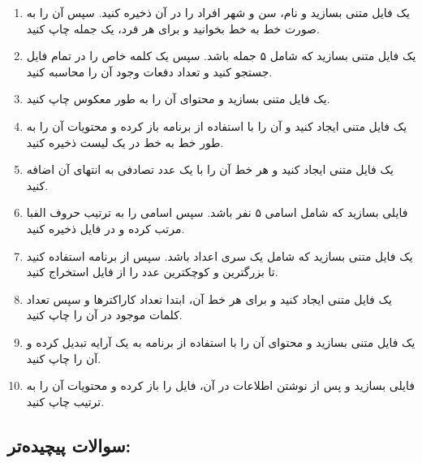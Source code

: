 \documentclass[a4paper,12pt]{article}
\begin{document}
	\begin{enumerate}
		\item یک فایل متنی بسازید و نام، سن و شهر افراد را در آن ذخیره کنید. سپس آن را به صورت خط به خط بخوانید و برای هر فرد، یک جمله چاپ کنید.
		\item یک فایل متنی بسازید که شامل ۵ جمله باشد. سپس یک کلمه خاص را در تمام فایل جستجو کنید و تعداد دفعات وجود آن را محاسبه کنید.
		\item یک فایل متنی بسازید و محتوای آن را به طور معکوس چاپ کنید.
		\item یک فایل متنی ایجاد کنید و آن را با استفاده از برنامه باز کرده و محتویات آن را به طور خط به خط در یک لیست ذخیره کنید.
		\item یک فایل متنی ایجاد کنید و هر خط آن را با یک عدد تصادفی به انتهای آن اضافه کنید.
		\item فایلی بسازید که شامل اسامی ۵ نفر باشد. سپس اسامی را به ترتیب حروف الفبا مرتب کرده و در فایل ذخیره کنید.
		\item یک فایل متنی بسازید که شامل یک سری اعداد باشد. سپس از برنامه استفاده کنید تا بزرگترین و کوچکترین عدد را از فایل استخراج کنید.
		\item یک فایل متنی ایجاد کنید و برای هر خط آن، ابتدا تعداد کاراکترها و سپس تعداد کلمات موجود در آن را چاپ کنید.
		\item یک فایل متنی بسازید و محتوای آن را با استفاده از برنامه به یک آرایه تبدیل کرده و آن را چاپ کنید.
		\item فایلی بسازید و پس از نوشتن اطلاعات در آن، فایل را باز کرده و محتویات آن را به ترتیب چاپ کنید.
	\end{enumerate}
	
	\subsection*{سوالات پیچیده‌تر:}
	
\end{document}

